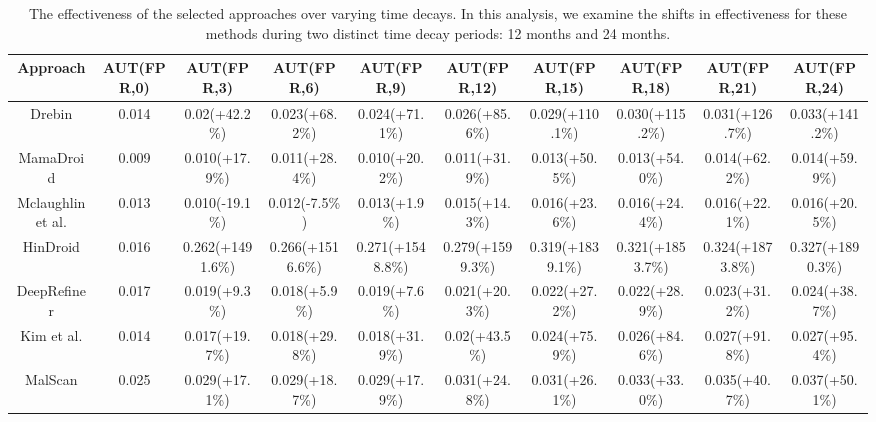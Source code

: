 \begin{table}[t]
    \centering
    \renewcommand{\arraystretch}{1.2}
    \caption{The effectiveness of the selected approaches over varying time decays. In this analysis, we examine the shifts in effectiveness for these methods during two distinct time decay periods: 12 months and 24 months.}
    \begin{adjustbox}{width=0.99\textwidth}
        \begin{tabular}{@{}c|c|c|c|c|c|c|c|c|c@{}}
            \toprule
            \textbf{Approach}         & \textbf{AUT(FPR,0)} & \textbf{AUT(FPR,3)} & \textbf{AUT(FPR,6)} & \textbf{AUT(FPR,9)} & \textbf{AUT(FPR,12)} & \textbf{AUT(FPR,15)} & \textbf{AUT(FPR,18)} & \textbf{AUT(FPR,21)} & \textbf{AUT(FPR,24)} \\ \midrule
            Drebin            & 0.014               & 0.02(+42.2\%)       & 0.023(+68.2\%)      & 0.024(+71.1\%)      & 0.026(+85.6\%)       & 0.029(+110.1\%)      & 0.030(+115.2\%)      & 0.031(+126.7\%)      & 0.033(+141.2\%)      \\ \midrule
            MamaDroid         & 0.009               & 0.010(+17.9\%)      & 0.011(+28.4\%)      & 0.010(+20.2\%)      & 0.011(+31.9\%)       & 0.013(+50.5\%)       & 0.013(+54.0\%)       & 0.014(+62.2\%)       & 0.014(+59.9\%)       \\ \midrule
            Mclaughlin et al. & 0.013               & 0.010(-19.1\%)      & 0.012(-7.5\%)       & 0.013(+1.9\%)       & 0.015(+14.3\%)       & 0.016(+23.6\%)       & 0.016(+24.4\%)       & 0.016(+22.1\%)       & 0.016(+20.5\%)       \\ \midrule
            HinDroid          & 0.016               & 0.262(+1491.6\%)    & 0.266(+1516.6\%)    & 0.271(+1548.8\%)    & 0.279(+1599.3\%)     & 0.319(+1839.1\%)     & 0.321(+1853.7\%)     & 0.324(+1873.8\%)     & 0.327(+1890.3\%)     \\ \midrule
            DeepRefiner       & 0.017               & 0.019(+9.3\%)       & 0.018(+5.9\%)       & 0.019(+7.6\%)       & 0.021(+20.3\%)       & 0.022(+27.2\%)       & 0.022(+28.9\%)       & 0.023(+31.2\%)       & 0.024(+38.7\%)       \\ \midrule
            Kim et al.        & 0.014               & 0.017(+19.7\%)      & 0.018(+29.8\%)      & 0.018(+31.9\%)      & 0.02(+43.5\%)        & 0.024(+75.9\%)       & 0.026(+84.6\%)       & 0.027(+91.8\%)       & 0.027(+95.4\%)       \\ \midrule
            MalScan           & 0.025               & 0.029(+17.1\%)      & 0.029(+18.7\%)      & 0.029(+17.9\%)      & 0.031(+24.8\%)       & 0.031(+26.1\%)       & 0.033(+33.0\%)       & 0.035(+40.7\%)       & 0.037(+50.1\%)       \\ \midrule

\end{tabular}
\end{adjustbox}
\end{table}
